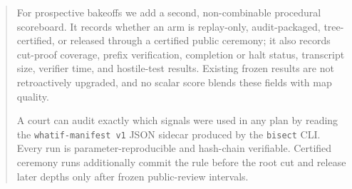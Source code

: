 \documentclass[12pt]{article}
\begin{document}
\begin{abstract}
For prospective bakeoffs we add a second, non-combinable procedural scoreboard.
It records whether an arm is replay-only, audit-packaged, tree-certified, or
released through a certified public ceremony; it also records cut-proof
coverage, prefix verification, completion or halt status, transcript size,
verifier time, and hostile-test results. Existing frozen results are not
retroactively upgraded, and no scalar score blends these fields with map
quality.

A court can audit exactly which signals were used in any plan by reading the
\texttt{whatif-manifest v1} JSON sidecar produced by the \texttt{bisect} CLI.
Every run is parameter-reproducible and hash-chain verifiable.
Certified ceremony runs additionally commit the rule before the root cut and
release later depths only after frozen public-review intervals.
\end{abstract}

\tableofcontents
\newpage












\end{document}
